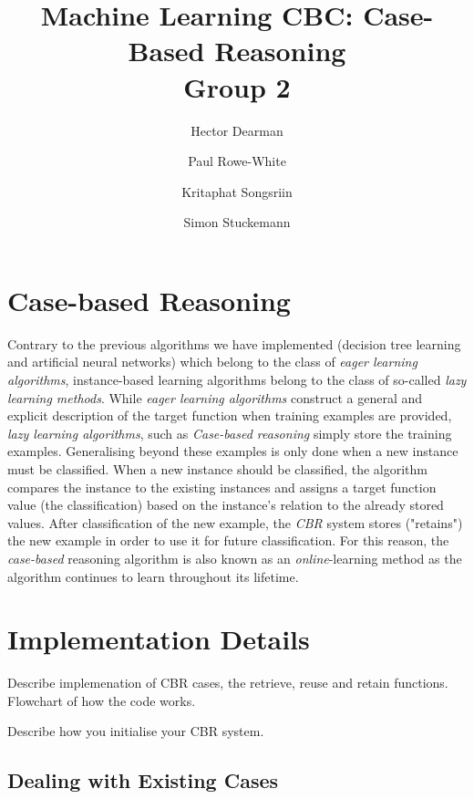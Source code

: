 \documentclass[10pt,a4paper]{article}
\author{Hector Dearman \and Paul Rowe-White \and Kritaphat Songsriin \and Simon Stuckemann}
\title{Machine Learning CBC: Case-Based Reasoning\\Group 2}
\begin{document}
\maketitle

\section{Case-based Reasoning}
Contrary to the previous algorithms we have implemented (decision tree learning and artificial neural networks) which belong to the class of \emph{eager learning algorithms}, instance-based learning algorithms belong to the class  of so-called \emph{lazy learning methods}. 
While \emph{eager learning algorithms} construct a general and explicit description of the target function when training examples are provided, \emph{lazy learning algorithms}, such as \emph{Case-based reasoning} simply store the training examples. Generalising beyond these examples is only done when a new instance must be classified. When a new instance should be classified, the algorithm compares the instance to the existing instances and assigns a target function value (the classification) based on the instance's relation to the already stored values. After classification of the new example, the \emph{CBR} system stores ("retains") the new example in order to use it for future classification. For this reason, the \emph{case-based} reasoning algorithm is also known as an \emph{online}-learning method as the algorithm continues to learn throughout its lifetime.

\section{Implementation Details}
Describe implemenation of CBR cases, the retrieve, reuse and retain functions. Flowchart of how the code works.

Describe how you initialise your CBR system.

\subsection{Dealing with Existing Cases}
\end{document}
